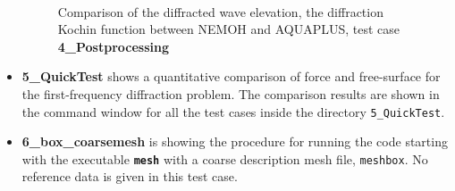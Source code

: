 \documentclass[12pt,a4paper,titlepage]{article}
\begin{document}
\begin{itemize}
\begin{figure}[h!tbp]
\centering
{}\\
\caption{Comparison of the diffracted wave elevation, the diffraction Kochin function between NEMOH and AQUAPLUS, test case \textbf{4\_Postprocessing}}\label{fig:PostProcessing}
\end{figure}

\item \textbf{5\_QuickTest} shows a quantitative comparison of force and free-surface for the first-frequency diffraction problem. The comparison results are shown in the command window for all the test cases inside the directory \texttt{5\_QuickTest}.

\item \textbf{6\_box\_coarsemesh} is showing the procedure for running the code starting with the executable \textbf{\texttt{mesh}} with a coarse description mesh file, \texttt{meshbox}. No reference data is given in this test case.


\end{itemize}
\end{document}
